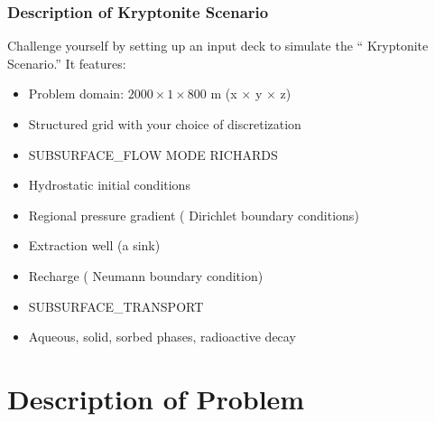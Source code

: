 \documentclass{beamer}
\newcommand\gehcomment[1]{{{\color{orange} #1}}}
\newcommand\redcomment[1]{{{\color{red} #1}}}
\begin{document}
\begin{frame}\frametitle{Description of Kryptonite Scenario}
Challenge yourself by setting up an input deck to simulate the ``\gehcomment{Kryptonite Scenario}.'' It features:
\begin{itemize}
  \item Problem domain: $2000 \times 1 \times 800$ m (x $\times$ y $\times$ z)
  \item \redcomment{Structured grid} with your choice of discretization
  \item SUBSURFACE\_FLOW MODE \redcomment{RICHARDS}
  \item \redcomment{Hydrostatic} initial conditions
  \item Regional pressure gradient (\redcomment{Dirichlet} boundary conditions)
  \item Extraction well (a \redcomment{sink})
  \item Recharge (\redcomment{Neumann} boundary condition)
  \item SUBSURFACE\_TRANSPORT
  \item Aqueous, solid, sorbed phases, radioactive decay
\end{itemize}

\end{frame}


\section{Description of Problem}
\end{document}
